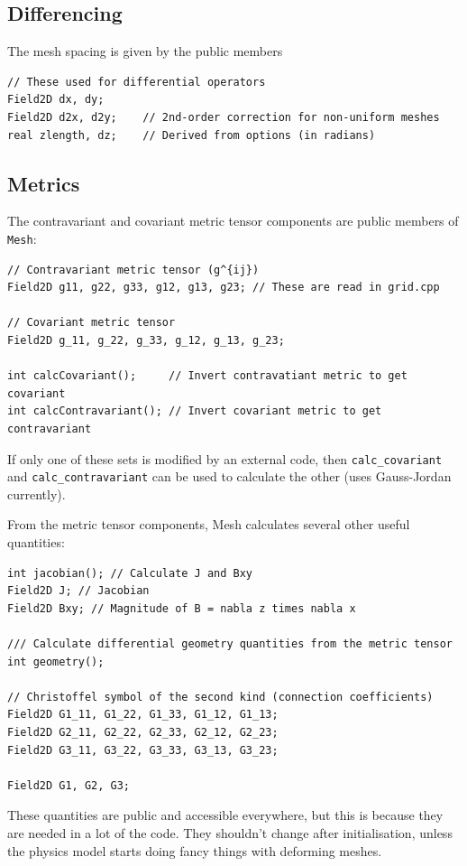 \documentclass[12pt]{article}
\newcommand{\code}[1]{\texttt{#1}}
\begin{document}
\subsection{Differencing}

The mesh spacing is given by the public members
\begin{lstlisting}
// These used for differential operators 
Field2D dx, dy;
Field2D d2x, d2y;    // 2nd-order correction for non-uniform meshes		
real zlength, dz;    // Derived from options (in radians)
\end{lstlisting}

\subsection{Metrics}

The contravariant and covariant metric tensor components are
public members of \code{Mesh}:
\begin{lstlisting}
// Contravariant metric tensor (g^{ij})
Field2D g11, g22, g33, g12, g13, g23; // These are read in grid.cpp

// Covariant metric tensor
Field2D g_11, g_22, g_33, g_12, g_13, g_23;

int calcCovariant();     // Invert contravatiant metric to get covariant
int calcContravariant(); // Invert covariant metric to get contravariant
\end{lstlisting}
If only one of these sets is modified by an external code, then
\code{calc\_covariant} and \code{calc\_contravariant} can be used
to calculate the other (uses Gauss-Jordan currently).

From the metric tensor components, Mesh calculates several other useful
quantities:
\begin{lstlisting}
int jacobian(); // Calculate J and Bxy
Field2D J; // Jacobian
Field2D Bxy; // Magnitude of B = nabla z times nabla x

/// Calculate differential geometry quantities from the metric tensor
int geometry();

// Christoffel symbol of the second kind (connection coefficients)
Field2D G1_11, G1_22, G1_33, G1_12, G1_13;
Field2D G2_11, G2_22, G2_33, G2_12, G2_23;
Field2D G3_11, G3_22, G3_33, G3_13, G3_23;
  
Field2D G1, G2, G3;
\end{lstlisting}

These quantities are public and accessible everywhere, but this is because
they are needed in a lot of the code. They shouldn't change
after initialisation, unless the physics model starts doing fancy things with
deforming meshes.
\end{document}
